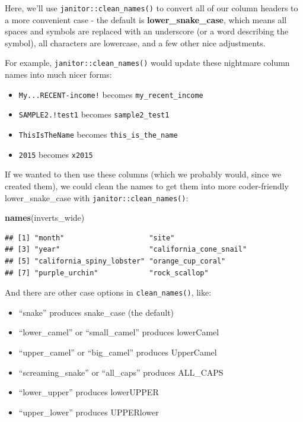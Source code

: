 \documentclass[]{book}
\newenvironment{Shaded}{\begin{snugshade}}{\end{snugshade}}
\newcommand{\KeywordTok}[1]{\textcolor[rgb]{0.13,0.29,0.53}{\textbf{#1}}}
\newcommand{\NormalTok}[1]{#1}
\newcommand{\OperatorTok}[1]{\textcolor[rgb]{0.81,0.36,0.00}{\textbf{#1}}}
\newcommand{\StringTok}[1]{\textcolor[rgb]{0.31,0.60,0.02}{#1}}
\providecommand{\tightlist}{%
  \setlength{\itemsep}{0pt}\setlength{\parskip}{0pt}}
\begin{document}
Here, we'll use \texttt{janitor::clean\_names()} to convert all of our column headers to a more convenient case - the default is \textbf{lower\_snake\_case}, which means all spaces and symbols are replaced with an underscore (or a word describing the symbol), all characters are lowercase, and a few other nice adjustments.

For example, \texttt{janitor::clean\_names()} would update these nightmare column names into much nicer forms:

\begin{itemize}
\tightlist
\item
  \texttt{My...RECENT-income!} becomes \texttt{my\_recent\_income}
\item
  \texttt{SAMPLE2.!test1} becomes \texttt{sample2\_test1}
\item
  \texttt{ThisIsTheName} becomes \texttt{this\_is\_the\_name}
\item
  \texttt{2015} becomes \texttt{x2015}
\end{itemize}

If we wanted to then use these columns (which we probably would, since we created them), we could clean the names to get them into more coder-friendly lower\_snake\_case with \texttt{janitor::clean\_names()}:

\begin{Shaded}
\end{Shaded}

\begin{Shaded}
\begin{Highlighting}[]
\KeywordTok{names}\NormalTok{(inverts_wide)}
\end{Highlighting}
\end{Shaded}

\begin{verbatim}
## [1] "month"                    "site"                    
## [3] "year"                     "california_cone_snail"   
## [5] "california_spiny_lobster" "orange_cup_coral"        
## [7] "purple_urchin"            "rock_scallop"
\end{verbatim}

And there are other case options in \texttt{clean\_names()}, like:

\begin{itemize}
\tightlist
\item
  ``snake'' produces snake\_case (the default)
\item
  ``lower\_camel'' or ``small\_camel'' produces lowerCamel
\item
  ``upper\_camel'' or ``big\_camel'' produces UpperCamel
\item
  ``screaming\_snake'' or ``all\_caps'' produces ALL\_CAPS
\item
  ``lower\_upper'' produces lowerUPPER
\item
  ``upper\_lower'' produces UPPERlower
\end{itemize}
\end{document}

